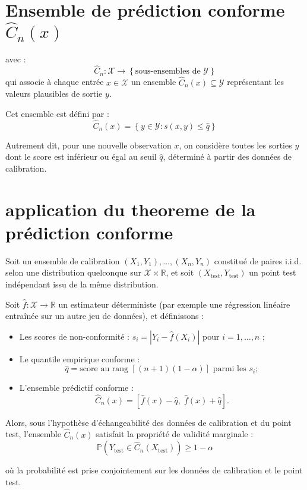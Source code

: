 \documentclass[a4paper,12pt]{article}%
\begin{document}
\section{Ensemble de prédiction conforme $\hat{C}_n(x)$}


    avec : 
    \[
    \hat{C}_n : \mathcal{X} \rightarrow \left\{ \text{sous-ensembles de } \mathcal{Y} \right\}
    \]
    qui associe à chaque entrée $x \in \mathcal{X}$ un ensemble $\hat{C}_n(x) \subseteq \mathcal{Y}$ représentant les valeurs plausibles de sortie $y$.
    
    Cet ensemble est défini par :
    \[
    \hat{C}_n(x) = \left\{ y \in \mathcal{Y} : s(x, y) \leq \hat{q} \right\}
    \]
    
    Autrement dit, pour une nouvelle observation $x$, on considère toutes les sorties $y$ dont le score est inférieur ou égal au seuil $\hat{q}$, déterminé à partir des données de calibration. 



\section{application du theoreme de la prédiction conforme}

\begin{theorem}
    Soit un ensemble de calibration $(X_1, Y_1), \dots, (X_n, Y_n)$ constitué de paires i.i.d. selon une distribution quelconque sur $\mathcal{X} \times \mathbb{R}$, et soit $(X_{\text{test}}, Y_{\text{test}})$ un point test indépendant issu de la même distribution.
    
    Soit $\hat{f} : \mathcal{X} \to \mathbb{R}$ un estimateur déterministe (par exemple une régression linéaire entraînée sur un autre jeu de données), et définissons :
    \begin{itemize}
        \item Les scores de non-conformité : $s_i = |Y_i - \hat{f}(X_i)|$ pour $i = 1, \dots, n$ ;
        \item Le quantile empirique conforme :
        \[
        \hat{q} = \text{score au rang } \left\lceil (n+1)(1 - \alpha) \right\rceil \text{ parmi les } s_i ;
        \]
        \item L'ensemble prédictif conforme :
        \[
        \hat{C}_n(x) = \left[ \hat{f}(x) - \hat{q},\; \hat{f}(x) + \hat{q} \right] .
        \]
    \end{itemize}
    
    Alors, sous l'hypothèse d'échangeabilité des données de calibration et du point test, l'ensemble $\hat{C}_n(x)$ satisfait la propriété de validité marginale :
    \[
    \mathbb{P}\left( Y_{\text{test}} \in \hat{C}_n(X_{\text{test}}) \right) \geq 1 - \alpha
    \]
    
    où la probabilité est prise conjointement sur les données de calibration et le point test.
    \end{theorem}
\end{document}
